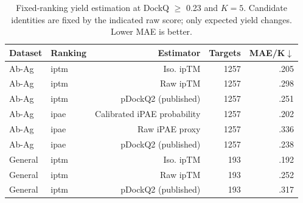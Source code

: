 \begin{table}[t]
\caption{Fixed-ranking yield estimation at DockQ $\geq$ 0.23 and $K=5$. Candidate identities are fixed by the indicated raw score; only expected yield changes. Lower MAE is better.}
\label{tab:workshop_yield}
\centering
\begin{tabular}{llrrr}
\toprule
Dataset & Ranking & Estimator & Targets & MAE/K$\downarrow$ \\
\midrule
Ab-Ag & iptm & Iso. ipTM & 1257 & .205 \\
Ab-Ag & iptm & Raw ipTM & 1257 & .298 \\
Ab-Ag & iptm & pDockQ2 (published) & 1257 & .251 \\
Ab-Ag & ipae & Calibrated iPAE probability & 1257 & .202 \\
Ab-Ag & ipae & Raw iPAE proxy & 1257 & .336 \\
Ab-Ag & ipae & pDockQ2 (published) & 1257 & .238 \\
General & iptm & Iso. ipTM & 193 & .192 \\
General & iptm & Raw ipTM & 193 & .252 \\
General & iptm & pDockQ2 (published) & 193 & .317 \\
\bottomrule
\end{tabular}
\end{table}
